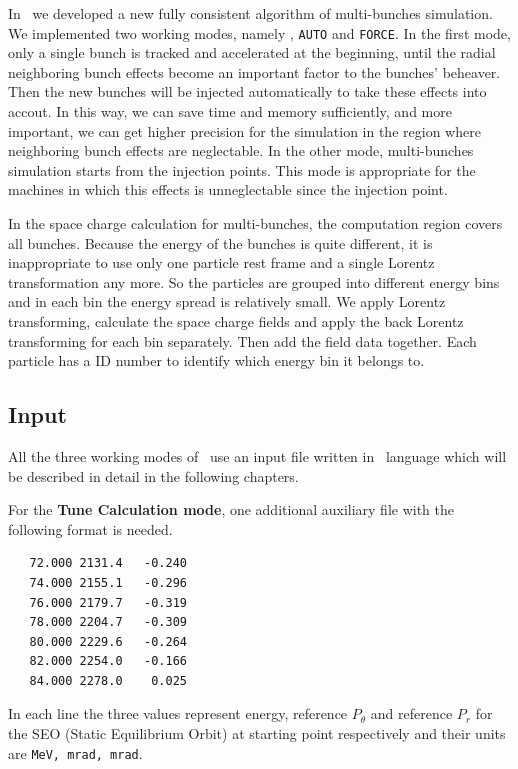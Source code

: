 In \opalcycl\, we developed a new fully consistent algorithm of multi-bunches simulation.  We implemented two working modes, namely , 
\texttt{AUTO} and \texttt{FORCE}. In the first mode, only a single bunch is tracked and accelerated at the beginning,
until the radial neighboring bunch effects become an important factor to the bunches' beheaver. Then the new bunches will be injected automatically to 
take these effects into accout. In this way, we can save time and memory sufficiently, and more important, 
we can get higher precision for the simulation in the region where neighboring bunch effects are neglectable.
In the other mode, multi-bunches simulation starts from the injection points. This mode is appropriate for the machines in which this effects is 
unneglectable since the injection point.    

In the space charge calculation for multi-bunches, the computation region covers all bunches.
Because the energy of the bunches is quite different, it is inappropriate to use only one particle rest frame and a single Lorentz transformation any more.
So the particles are grouped into different energy bins and in each bin the energy spread is relatively small. We apply Lorentz transforming, calculate
the space charge fields and apply the back Lorentz transforming for each bin separately. Then add the field data together. Each particle has a ID number to identify 
which energy bin it belongs to.

\subsection{Input}  
All the three working modes of \opalcycl\ use an input file written in \mad\ language which will be described in detail in the following chapters.

For the  {\bfseries Tune Calculation mode}, one additional auxiliary file with the following format is needed.
\begin{verbatim}
   72.000 2131.4   -0.240  
   74.000 2155.1   -0.296  
   76.000 2179.7   -0.319 
   78.000 2204.7   -0.309 
   80.000 2229.6   -0.264 
   82.000 2254.0   -0.166 
   84.000 2278.0    0.025 
\end{verbatim}
In each line the three values represent energy, reference $P_\theta$ and reference $P_r$ for the SEO (Static Equilibrium Orbit) 
at starting point respectively and their units are {\tt MeV,  mrad,  mrad}.

